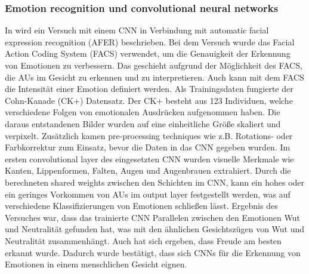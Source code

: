 \subsubsection*{Emotion recognition und convolutional neural networks}
In \cite{facialemotionrecusingcnn} wird ein Versuch mit einem CNN in Verbindung mit automatic facial expression recognition (AFER) beschrieben. Bei dem Versuch wurde das Facial Action Coding System (FACS) verwendet, um die Genauigkeit der Erkennung von Emotionen zu verbessern. Das geschieht aufgrund der Möglichkeit des FACS, die AUs im Gesicht zu erkennen und zu interpretieren. Auch kann mit dem FACS die Intensität einer Emotion definiert werden. Als Trainingsdaten fungierte der Cohn-Kanade (CK+) Datensatz. Der CK+ besteht aus 123 Individuen, welche verschiedene Folgen von emotionalen Ausdrücken aufgenommen haben. Die daraus entstandenen Bilder wurden auf eine einheitliche Größe skaliert und verpixelt. Zusätzlich kamen pre-processing techniques wie z.B. Rotations- oder Farbkorrektur zum Einsatz, bevor die Daten in das CNN gegeben wurden. Im ersten convolutional layer des eingesetzten CNN wurden visuelle Merkmale wie Kanten, Lippenformen, Falten, Augen und Augenbrauen extrahiert. Durch die berechneten shared weights zwischen den Schichten im CNN, kann ein hohes oder ein geringes Vorkommen von AUs im output layer festgestellt werden, was auf verschiedene Klassifizierungen von Emotionen schließen lässt. Ergebnis des Versuches war, dass das trainierte CNN Parallelen zwischen den Emotionen Wut und Neutralität gefunden hat, was mit den ähnlichen Gesichtszügen von Wut und Neutralität zusammenhängt. Auch hat sich ergeben, dass Freude am besten erkannt wurde. Dadurch wurde bestätigt, dass sich CNNs für die Erkennung von Emotionen in einem menschlichen Gesicht eignen.
\\
\\
